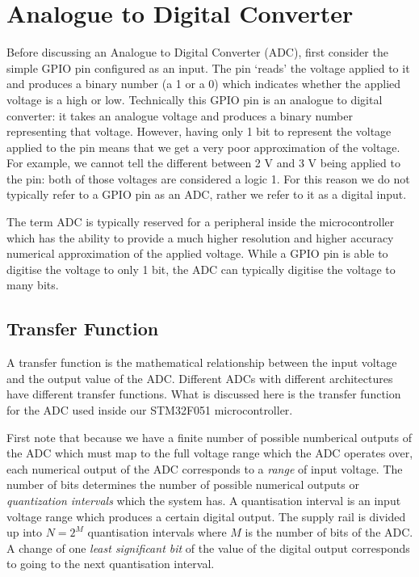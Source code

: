 \chapter{Analogue to Digital Converter}

Before discussing an Analogue to Digital Converter (ADC), first consider the simple GPIO pin configured as an input. 
The pin `reads' the voltage applied to it and produces a binary number (a 1 or a 0) which indicates whether the applied voltage is a high or low. Technically this GPIO pin is an analogue to digital converter: it takes an analogue voltage and produces a binary number representing that voltage. 
However, having only 1 bit to represent the voltage applied to the pin means that we get a very poor approximation of the voltage. 
For example, we cannot tell the different between 2 V and 3 V being applied to the pin: both of those voltages are considered a logic 1. 
For this reason we do not typically refer to a GPIO pin as an ADC, rather we refer to it as a digital input.

The term ADC is typically reserved for a peripheral inside the microcontroller which has the ability to provide a much higher resolution and higher accuracy numerical approximation of the applied voltage. 
While a GPIO pin is able to digitise the voltage to only 1 bit, the ADC can typically digitise the voltage to many bits. 

\section{Transfer Function}
A transfer function is the mathematical relationship between the input voltage and the output value of the ADC.
Different ADCs with different architectures have different transfer functions. What is discussed here is the transfer function for the ADC used inside our STM32F051 microcontroller. 

First note that because we have a finite number of possible numberical outputs of the ADC which must map to the full voltage range which the ADC operates over, each numerical output of the ADC corresponds to a \emph{range} of input voltage. 
The number of bits determines the number of possible numerical outputs or \emph{quantization intervals} which the system has. A quantisation interval is an input voltage range which produces a certain digital output. The supply rail is divided up into \(N = 2^M\) quantisation intervals where \(M\) is the number of bits of the ADC. 
A change of one \emph{least significant bit} of the value of the digital output corresponds to going to the next quantisation interval. 


